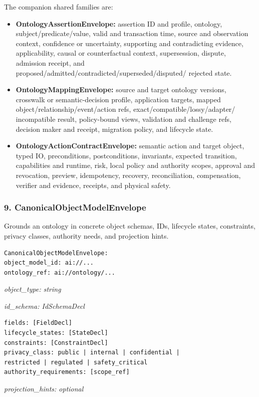 \documentclass[
  11pt,
]{article}
\providecommand{\tightlist}{%
  \setlength{\itemsep}{0pt}\setlength{\parskip}{0pt}}
\begin{document}
The companion shared families are:

\begin{itemize}
\tightlist
\item
  \textbf{OntologyAssertionEnvelope:} assertion ID and profile, ontology,
  subject/predicate/value, valid and transaction time, source and observation
  context, confidence or uncertainty, supporting and contradicting evidence,
  applicability, causal or counterfactual context, supersession, dispute,
  admission receipt, and proposed/admitted/contradicted/superseded/disputed/
  rejected state.
\item
  \textbf{OntologyMappingEnvelope:} source and target ontology versions,
  crosswalk or semantic-decision profile, application targets, mapped
  object/relationship/event/action refs, exact/compatible/lossy/adapter/
  incompatible result, policy-bound views, validation and challenge refs,
  decision maker and receipt, migration policy, and lifecycle state.
\item
  \textbf{OntologyActionContractEnvelope:} semantic action and target object,
  typed IO, preconditions, postconditions, invariants, expected transition,
  capabilities and runtime, risk, local policy and authority scopes, approval
  and revocation, preview, idempotency, recovery, reconciliation,
  compensation, verifier and evidence, receipts, and physical safety.
\end{itemize}

\hypertarget{canonicalobjectmodelenvelope}{%
\subsubsection{9.
CanonicalObjectModelEnvelope}\label{canonicalobjectmodelenvelope}}

Grounds an ontology in concrete object schemas, IDs, lifecycle states,
constraints, privacy classes, authority needs, and projection hints.

\begin{lstlisting}[language=rustioi]
CanonicalObjectModelEnvelope:
object_model_id: ai://...
ontology_ref: ai://ontology/...
\end{lstlisting}
\emph{object\_type: string}

\emph{id\_schema: IdSchemaDecl}

\begin{lstlisting}[language={},basicstyle=\ttfamily\scriptsize]
fields: [FieldDecl]
lifecycle_states: [StateDecl]
constraints: [ConstraintDecl]
privacy_class: public | internal | confidential |
restricted | regulated | safety_critical
authority_requirements: [scope_ref]
\end{lstlisting}
\emph{projection\_hints: optional}
\end{document}
